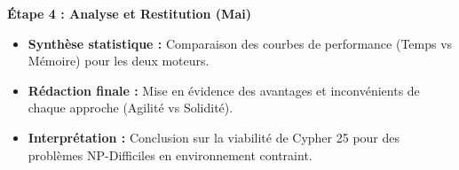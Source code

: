 \documentclass{article}
\begin{document}
\begin{description}
\begin{itemize}
            \end{itemize}

        \item \textbf{Étape 4 : Analyse et Restitution (Mai)}
            
            \begin{itemize}
                
                \item \textbf{Synthèse statistique :} Comparaison des courbes de performance (Temps vs Mémoire) pour les deux moteurs.
                \item \textbf{Rédaction finale :} Mise en évidence des avantages et inconvénients de chaque approche (Agilité vs Solidité).
                \item \textbf{Interprétation :} Conclusion sur la viabilité de Cypher 25 pour des problèmes NP-Difficiles en environnement contraint.
            
            \end{itemize}
    \end{description}
\end{document}
